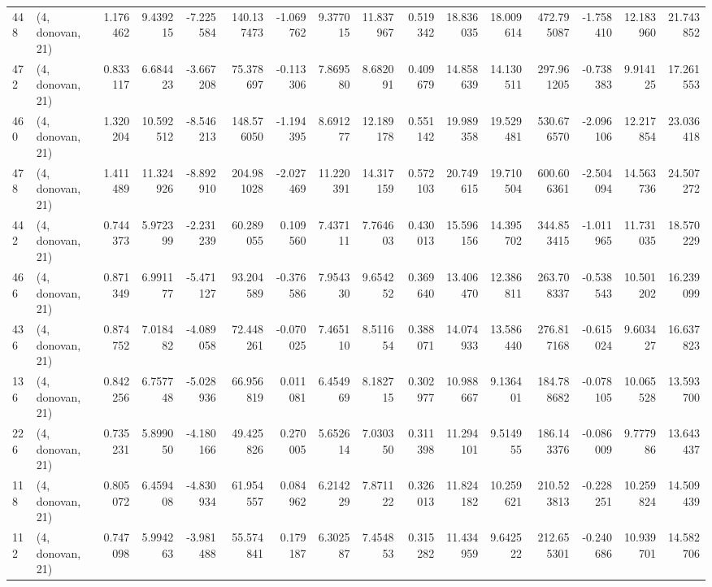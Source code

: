\begin{tabular}{llrrrrrrrrrrrrrr}
448 &  (4, donovan, 21) &   1.176462 &   9.439215 &  -7.225584 &   140.137473 &  -1.069762 &   9.377015 &  11.837967 &  0.519342 &  18.836035 &  18.009614 &   472.795087 & -1.758410 &  12.183960 &  21.743852 \\
472 &  (4, donovan, 21) &   0.833117 &   6.684423 &  -3.667208 &    75.378697 &  -0.113306 &   7.869580 &   8.682091 &  0.409679 &  14.858639 &  14.130511 &   297.961205 & -0.738383 &   9.914125 &  17.261553 \\
460 &  (4, donovan, 21) &   1.320204 &  10.592512 &  -8.546213 &   148.576050 &  -1.194395 &   8.691277 &  12.189178 &  0.551142 &  19.989358 &  19.529481 &   530.676570 & -2.096106 &  12.217854 &  23.036418 \\
478 &  (4, donovan, 21) &   1.411489 &  11.324926 &  -8.892910 &   204.981028 &  -2.027469 &  11.220391 &  14.317159 &  0.572103 &  20.749615 &  19.710504 &   600.606361 & -2.504094 &  14.563736 &  24.507272 \\
442 &  (4, donovan, 21) &   0.744373 &   5.972399 &  -2.231239 &    60.289055 &   0.109560 &   7.437111 &   7.764603 &  0.430013 &  15.596156 &  14.395702 &   344.853415 & -1.011965 &  11.731035 &  18.570229 \\
466 &  (4, donovan, 21) &   0.871349 &   6.991177 &  -5.471127 &    93.204589 &  -0.376586 &   7.954330 &   9.654252 &  0.369640 &  13.406470 &  12.386811 &   263.708337 & -0.538543 &  10.501202 &  16.239099 \\
436 &  (4, donovan, 21) &   0.874752 &   7.018482 &  -4.089058 &    72.448261 &  -0.070025 &   7.465110 &   8.511654 &  0.388071 &  14.074933 &  13.586440 &   276.817168 & -0.615024 &   9.603427 &  16.637823 \\
136 &  (4, donovan, 21) &   0.842256 &   6.757748 &  -5.028936 &    66.956819 &   0.011081 &   6.454969 &   8.182715 &  0.302977 &  10.988667 &   9.136401 &   184.788682 & -0.078105 &  10.065528 &  13.593700 \\
226 &  (4, donovan, 21) &   0.735231 &   5.899050 &  -4.180166 &    49.425826 &   0.270005 &   5.652614 &   7.030350 &  0.311398 &  11.294101 &   9.514955 &   186.143376 & -0.086009 &   9.777986 &  13.643437 \\
118 &  (4, donovan, 21) &   0.805072 &   6.459408 &  -4.830934 &    61.954557 &   0.084962 &   6.214229 &   7.871122 &  0.326013 &  11.824182 &  10.259621 &   210.523813 & -0.228251 &  10.259824 &  14.509439 \\
112 &  (4, donovan, 21) &   0.747098 &   5.994263 &  -3.981488 &    55.574841 &   0.179187 &   6.302587 &   7.454853 &  0.315282 &  11.434959 &   9.642522 &   212.655301 & -0.240686 &  10.939701 &  14.582706 \\

\end{tabular}
